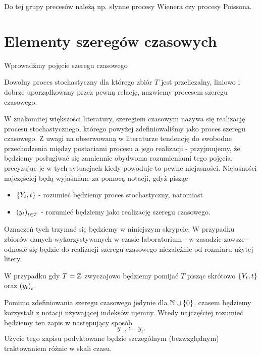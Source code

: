 \documentclass[10pt,a4paper]{book}
\begin{document}
Do tej grupy precesów należą np. słynne procesy Wienera czy procesy Poissona.

\section{Elementy szeregów czasowych}

Wprowadźmy pojęcie szeregu czasowego 

\begin{definition}
Dowolny proces stochastyczny dla którego zbiór $T$ jest przeliczalny, liniowo i dobrze uporządkowany przez pewną relację, nazwiemy procesem szeregu czasowego.
\end{definition}

\begin{remark}
W znakomitej większości literatury, szeregiem czasowym nazywa się realizację procesu stochastycznego, którego powyżej zdefiniowaliśmy jako proces szeregu czasowego. Z uwagi na obserwowaną w literaturze tendencję do swobodne przechodzenia między postaciami procesu a jego realizacji - przyjmujemy, że będziemy posługiwać się zamiennie obydwoma rozumieniami tego pojęcia, precyzując je w tych sytuacjach kiedy powoduje to pewne niejasności. Niejasności najczęściej będą wyjaśniane za pomocą notacji, gdyż pisząc
\begin{itemize}
\item $\left\lbrace {{Y_t}, {t}} \right\rbrace$ - rozumieć będziemy proces stochastyczny, natomiast
\item $\left( {y_t} \right)_{t \in T}^{}$ - rozumieć będziemy jako realizację szeregu czasowego.
\end{itemize}
Oznaczeń tych trzymać się będziemy w niniejszym skrypcie. W przypadku zbiorów danych wykorzystywanych w czasie laboratorium - w zasadzie zawsze - odnosić się będzie do realizacji szeregu czasowego niezależnie od rozmiaru użytej litery.
\end{remark}

\begin{remark}
W przypadku gdy $T = \mathbb{Z} $ zwyczajowo będziemy pomijać $T$ pisząc skrótowo $\left\lbrace {{Y_t}, {t}} \right\rbrace$ oraz $\left({y_t}\right)_{t}$.
\end{remark}

\begin{remark}
Pomimo zdefiniowania szeregu czasowego jedynie dla $\mathbb{N} \cup \left\lbrace {0} \right\rbrace $, czasem będziemy korzystali z notacji używającej indeksów ujemny. Wtedy najczęściej rozumieć będziemy ten zapis w następujący sposób
$$
y_{-t} := y_{t}.
$$
Użycie tego zapisu podyktowane będzie szczególnym (bezwzględnym) traktowaniem różnic w skali czasu.
\end{remark}
\end{document}
